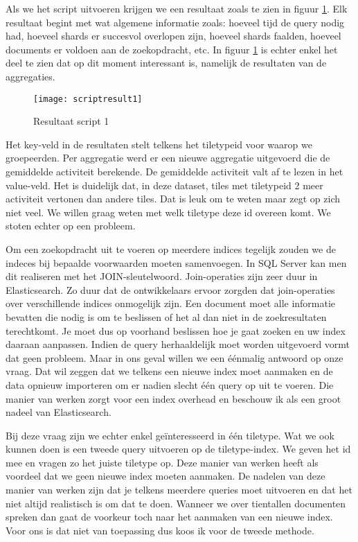 Als we het script uitvoeren krijgen we een resultaat zoals te zien in figuur \ref{fig:scriptresult1}. Elk resultaat begint met wat algemene informatie zoals: hoeveel tijd de query nodig had, hoeveel shards er succesvol overlopen zijn, hoeveel shards faalden, hoeveel documents er voldoen aan de zoekopdracht, etc. In figuur \ref{fig:scriptresult1} is echter enkel het deel te zien dat op dit moment interessant is, namelijk de resultaten van de aggregaties.

\begin{figure}
	\centering
	\texttt{[image: scriptresult1]}
	\caption{Resultaat script 1}
	\label{fig:scriptresult1}
\end{figure}

Het key-veld in de resultaten stelt telkens het tiletypeid voor waarop we groepeerden. Per aggregatie werd er een nieuwe aggregatie uitgevoerd die de gemiddelde activiteit berekende. De gemiddelde activiteit valt af te lezen in het value-veld. Het is duidelijk dat, in deze dataset, tiles met tiletypeid 2 meer activiteit vertonen dan andere tiles. Dat is leuk om te weten maar zegt op zich niet veel. We willen graag weten met welk tiletype deze id overeen komt. We stoten echter op een probleem.

Om een zoekopdracht uit te voeren op meerdere indices tegelijk zouden we de indeces bij bepaalde voorwaarden moeten samenvoegen. In SQL Server kan men dit realiseren met het JOIN-sleutelwoord. Join-operaties zijn zeer duur in Elasticsearch. Zo duur dat de ontwikkelaars ervoor zorgden dat join-operaties over verschillende indices onmogelijk zijn. Een document moet alle informatie bevatten die nodig is om te beslissen of het al dan niet in de zoekresultaten terechtkomt. Je moet dus op voorhand beslissen hoe je gaat zoeken en uw index daaraan aanpassen. Indien de query herhaaldelijk moet worden uitgevoerd vormt dat geen probleem. Maar in ons geval willen we een éénmalig antwoord op onze vraag. Dat wil zeggen dat we telkens een nieuwe index moet aanmaken en de data opnieuw importeren om er nadien slecht één query op uit te voeren. Die manier van werken zorgt voor een index overhead en beschouw ik als een groot nadeel van Elasticsearch.

Bij deze vraag zijn we echter enkel geïnteresseerd in één tiletype. Wat we ook kunnen doen is een tweede query uitvoeren op de tiletype-index. We geven het id mee en vragen zo het juiste tiletype op. Deze manier van werken heeft als voordeel dat we geen nieuwe index moeten aanmaken. De nadelen van deze manier van werken zijn dat je telkens meerdere queries moet uitvoeren en dat het niet altijd realistisch is om dat te doen. Wanneer we over tientallen documenten spreken dan gaat de voorkeur toch naar het aanmaken van een nieuwe index. Voor ons is dat niet van toepassing dus koos ik voor de tweede methode.

